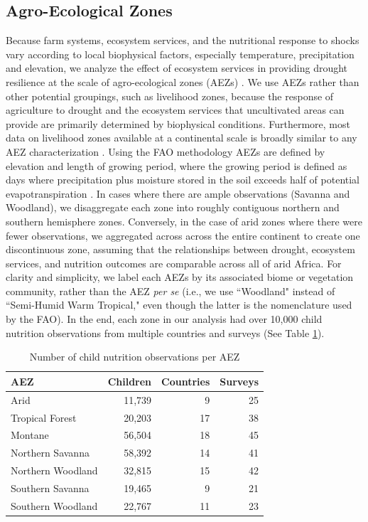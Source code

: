 \documentclass{article}
\begin{document}
\subsection{Agro-Ecological Zones}
Because farm systems, ecosystem services, and the nutritional response to shocks vary according to local biophysical factors, especially temperature, precipitation and elevation, we analyze the effect of ecosystem services in providing drought resilience at the scale of agro-ecological zones (AEZs) \cite{dimitrova2020monsoon}.  We use AEZs rather than other potential groupings, such as livelihood zones, because the response of agriculture to drought and the ecosystem services that uncultivated areas can provide are primarily determined by biophysical conditions.  Furthermore, most data on livelihood zones available at a continental scale is broadly similar to any AEZ characterization \cite{Lynam2002}.  Using the FAO methodology \cite{Fischer2006} AEZs are defined by elevation and length of growing period, where the growing period is defined as days where precipitation plus moisture stored in the soil exceeds half of potential evapotranspiration \cite{Fischer2006}.  In cases where there are ample observations (Savanna and Woodland), we disaggregate each zone into roughly contiguous northern and southern hemisphere zones.  Conversely, in the case of arid zones where there were fewer observations, we aggregated across across the entire continent to create one discontinuous zone, assuming that the relationships between drought, ecosystem services, and nutrition outcomes are comparable across all of arid Africa.  For clarity and simplicity, we label each AEZs by its associated biome or vegetation community, rather than the AEZ \textit{per se} (i.e., we use ``Woodland" instead of ``Semi-Humid Warm Tropical," even though the latter is the nomenclature used by the FAO).  In the end, each zone in our analysis had over 10,000 child nutrition observations from multiple countries and surveys (See Table \ref{table:AEZtab}).

\begin{table}[h]
	\begin{center}
	\begin{tabular}{l | r | r | r}
		AEZ & Children & Countries & Surveys \\
		\hline
		Arid & 11,739 & 9 & 25\\
		Tropical Forest & 20,203 & 17 & 38 \\
    Montane & 56,504 & 18 & 45 \\
		Northern Savanna & 58,392 & 14 & 41 \\
		Northern Woodland & 32,815 & 15 & 42 \\
		Southern Savanna & 19,465 & 9 & 21 \\
		Southern Woodland & 22,767 & 11 & 23 \\
	\end{tabular}
\caption{Number of child nutrition observations per AEZ}
\label{table:AEZtab}
\end{center}
\end{table}
\end{document}
